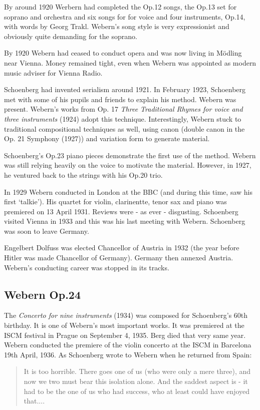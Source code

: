 By around 1920 Werbern had completed the Op.12 songs, the Op.13 set for soprano and orchestra and six songs for for voice and four instruments, Op.14, with words by Georg Trakl. Webern's song style is very expressionist and obviously quite demanding for the soprano. 

By 1920 Webern had ceased to conduct opera and was now living in M\"odling near Vienna. Money remained tight, even when Webern was appointed as modern music adviser for Vienna Radio.  

Schoenberg had invented serialism around 1921. In February 1923, Schoenberg met with some of his pupils and friends to explain his method. Webern was present. Webern's works from Op. 17 \textit{Three Traditional Rhymes for voice and three instruments} (1924) adopt this technique. Interestingly, Webern stuck to traditional compositional techniques as well, using canon (double canon in the Op. 21 Symphony (1927)) and variation form to generate material. 

Schoenberg's Op.23 piano pieces demonstrate the first use of the method. Webern was still relying heavily on the voice to motivate the material. However, in 1927, he ventured back to the strings with his Op.20 trio. 
  
In 1929 Webern conducted in London at the BBC (and during this time, saw his first `talkie'). His quartet for violin, clarinentte, tenor sax and piano was premiered on 13 April 1931. Reviews were - as ever - disgusting. Schoenberg visited Vienna in 1933 and this was his last meeting with Webern. Schoenberg was soon to leave Germany. 

Engelbert Dolfuss was elected Chancellor of Austria in 1932 (the year before Hitler was made Chancellor of Germany). Germany then annexed Austria. Webern's conducting career was stopped in its tracks. 

\subsection{Webern Op.24}
 
The \textit{Concerto for nine instruments} (1934) was composed for Schoenberg's 60th birthday. It is one of Webern's most important works. It was premiered at the ISCM festival in Prague on September 4, 1935. Berg died that very same year. Webern conducted the premiere of the violin concerto at the ISCM in Barcelona 19th April, 1936. As Schoenberg wrote to Webern when he returned from Spain:

\begin{quote}
It is too horrible. There goes one of us (who were only a mere three), and now we two must bear this isolation alone. And the saddest aspect is - it had to be the one of us who had success, who at least could have enjoyed that....
\end{quote}


